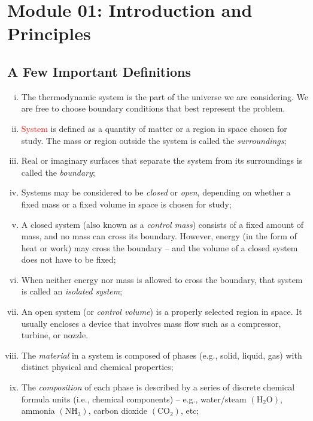 \documentclass[12pts,a4paper,amsmath,amssymb,floatfix]{article}%
\newcommand{\red}{\textcolor{red}}
\begin{document}
\section{Module 01: Introduction and Principles}\label{Section:01}

\subsection{A Few Important Definitions}
  
   \begin{enumerate}[i)]
%
       \item The thermodynamic system is the part of the universe we are considering. We are free to choose boundary conditions that best represent the problem.
%
       \item \red{System} is defined as a quantity of matter or a region in space chosen for study. The mass or region outside the system is called the {\it surroundings};
%
       \item Real or imaginary surfaces that separate the system from its surroundings is called the {\it boundary};
%
      \item Systems may be considered to be {\it closed} or {\it open}, depending on whether a fixed mass or a fixed volume in space is chosen for study; 
%
      \item A closed system (also known as a {\it control mass}) consists of a fixed amount of mass, and no mass can cross its boundary. However, energy (in the form of heat or work) may cross the boundary -- and the volume of a closed system does not have to be fixed; 
%
      \item When neither energy nor mass is allowed to cross the boundary, that system is called an {\it isolated system};
%
      \item An open system (or {\it control volume}) is a properly selected region in space. It usually encloses a device that involves mass flow such as a compressor, turbine, or nozzle.
%
      \item The {\it material} in a system is composed of phases (e.g., solid, liquid, gas) with distinct physical and chemical properties;
%
      \item The {\it composition} of each phase is described by a series of discrete chemical formula units (i.e., chemical components) -- e.g., water/steam $\left(\right.$H$_{2}$O$\left.\right)$, ammonia $\left(\right.$NH$_{3}\left.\right)$, carbon dioxide $\left(\right.$CO$_{2}\left.\right)$, etc;

\end{enumerate}
\end{document}
